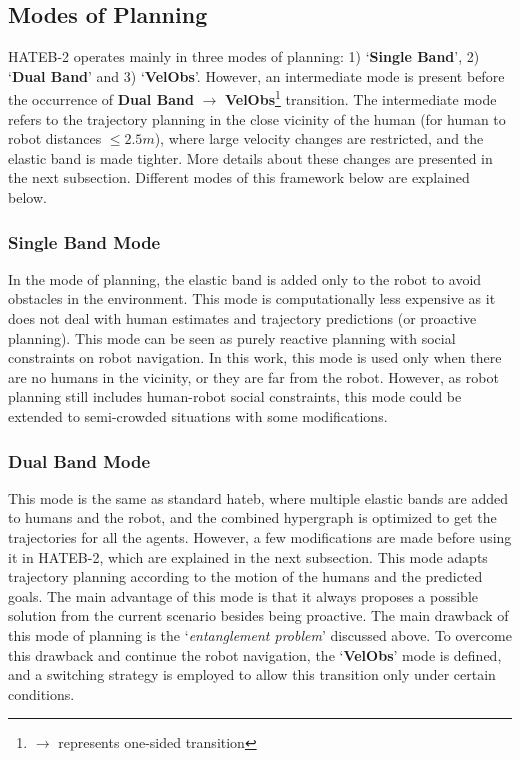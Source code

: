 \subsection{Modes of Planning}
HATEB-2 operates mainly in three modes of planning: 1) `\textbf{Single Band}', 2) `\textbf{Dual Band}' and 3) `\textbf{VelObs}'. However, an intermediate mode is present before the occurrence of \textbf{Dual Band} $\rightarrow$ \textbf{VelObs}\footnote{$\rightarrow$ represents one-sided transition} transition. The intermediate mode refers to the trajectory planning in the close vicinity of the human (for human to robot distances $\le 2.5m$), where large velocity changes are restricted, and the elastic band is made tighter. More details about these changes are presented in the next subsection. Different modes of this framework below are explained below. 
 
\subsubsection{Single Band Mode}
In the mode of planning, the elastic band is added only to the robot to avoid obstacles in the environment. This mode is computationally less expensive as it does not deal with human estimates and trajectory predictions (or proactive planning). This mode can be seen as purely reactive planning with social constraints on robot navigation. In this work, this mode is used only when there are no humans in the vicinity, or they are far from the robot. However, as robot planning still includes human-robot social constraints, this mode could be extended to semi-crowded situations with some modifications.

\subsubsection{Dual Band Mode}
This mode is the same as standard \acrshort{hateb}, where multiple elastic bands are added to humans and the robot, and the combined hypergraph is optimized to get the trajectories for all the agents. However, a few modifications are made before using it in HATEB-2, which are explained in the next subsection. This mode adapts trajectory planning according to the motion of the humans and the predicted goals. The main advantage of this mode is that it always proposes a possible solution from the current scenario besides being proactive. The main drawback of this mode of planning is the `\textit{entanglement problem}' discussed above. To overcome this drawback and continue the robot navigation, the `\textbf{VelObs}' mode is defined, and a switching strategy is employed to allow this transition only under certain conditions.

